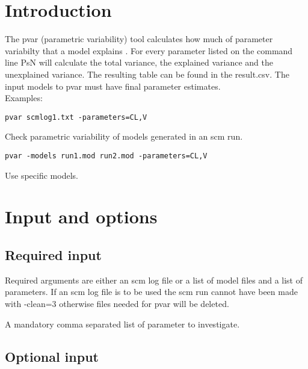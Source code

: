 

\newcommand{\guidetoolname}{pvar}



\maketitle


\section{Introduction}
The pvar (parametric variability) tool calculates how much of parameter variabilty that a model explains \cite{Hennig}. For every parameter listed on the command line PsN will calculate the total variance, the explained variance and the unexplained variance. The resulting table can be found in the result.csv. The input models to pvar must have final parameter estimates.\\
Examples:
\begin{verbatim}
pvar scmlog1.txt -parameters=CL,V
\end{verbatim}
Check parametric variability of models generated in an scm run.
\begin{verbatim}
pvar -models run1.mod run2.mod -parameters=CL,V
\end{verbatim}
Use specific models.
\section{Input and options}

\subsection{Required input}
Required arguments are either an scm log file or a list of model files and a list of parameters. If an scm log file is to be used the scm run cannot have been made with -clean=3 otherwise files needed for pvar will be deleted.

\begin{optionlist}
A mandatory comma separated list of parameter to investigate.
\nextopt
\end{optionlist}

\subsection{Optional input}

